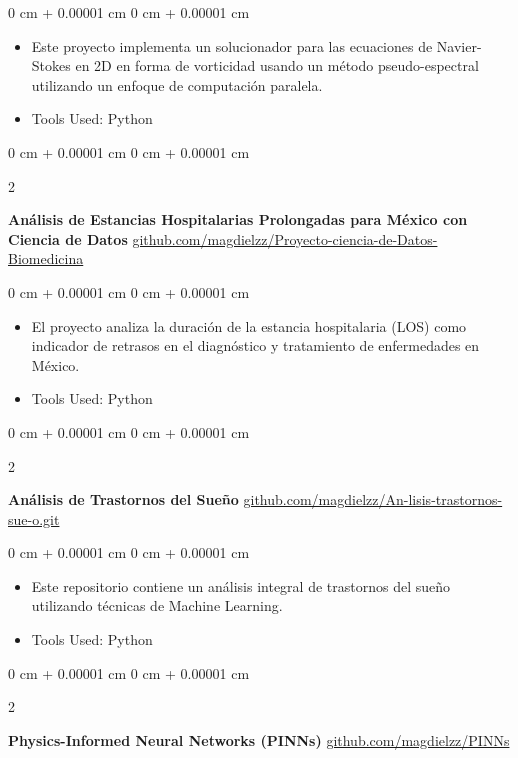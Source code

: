 \documentclass[10pt, letterpaper]{article}
\newenvironment{highlights}{
    \begin{itemize}[
        topsep=0.10 cm,
        parsep=0.10 cm,
        partopsep=0pt,
        itemsep=0pt,
        leftmargin=0 cm + 10pt
    ]
}{
    \end{itemize}
} %
\newenvironment{onecolentry}{
    \begin{adjustwidth}{
        0 cm + 0.00001 cm
    }{
        0 cm + 0.00001 cm
    }
}{
    \end{adjustwidth}
} %
\newenvironment{twocolentry}[2][]{
    \onecolentry
    \def\secondColumn{#2}
    \setcolumnwidth{\fill, 4.5 cm}
    \begin{paracol}{2}
}{
    \switchcolumn \raggedleft \secondColumn
    \end{paracol}
    \endonecolentry
} %
\begin{document}
        \vspace{0.10 cm}
        \begin{onecolentry}
            \begin{highlights}
                \item Este proyecto implementa un solucionador para las ecuaciones de Navier-Stokes en 2D en forma de vorticidad usando un método pseudo-espectral utilizando un enfoque de computación paralela.
                \item Tools Used: Python
            \end{highlights}
        \end{onecolentry}

        \vspace{0.2 cm}

        \begin{twocolentry}{
            \href{https://github.com/magdielzz/Proyecto-ciencia-de-Datos-Biomedicina.git}{github.com/magdielzz/Proyecto-ciencia-de-Datos-Biomedicina}
        }
            \textbf{Análisis de Estancias Hospitalarias Prolongadas para México con Ciencia de Datos}\end{twocolentry}

        \vspace{0.10 cm}
        \begin{onecolentry}
            \begin{highlights}
                \item El proyecto analiza la duración de la estancia hospitalaria (LOS) como indicador de retrasos en el diagnóstico y tratamiento de enfermedades en México.
                \item Tools Used: Python
            \end{highlights}
        \end{onecolentry}

        \vspace{0.2 cm}
        \begin{twocolentry}{
            \href{https://github.com/magdielzz/An-lisis-trastornos-sue-o.git}{github.com/magdielzz/An-lisis-trastornos-sue-o.git}
        }
            \textbf{Análisis de Trastornos del Sueño}\end{twocolentry}

        \vspace{0.10 cm}
        \begin{onecolentry}
            \begin{highlights}
                \item Este repositorio contiene un análisis integral de trastornos del sueño utilizando técnicas de Machine Learning.
                \item Tools Used: Python
            \end{highlights}
        \end{onecolentry}
        \begin{twocolentry}{
            \href{https://github.com/magdielzz/PINNs}{github.com/magdielzz/PINNs}
        }
            \textbf{Physics-Informed Neural Networks (PINNs)}\end{twocolentry}
\end{document}
